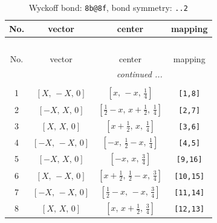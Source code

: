 \documentclass[fleqn,8pt]{jsarticle}
\begin{document}
\renewcommand{\arraystretch}{1.2}
\begin{longtable}{cccc}
\caption{Wyckoff bond: {\tt 8b@8f}, bond symmetry: {\tt ..2}}
 \\
 \hline \hline
No. & vector & center & mapping \\ \hline \endfirsthead

\multicolumn{3}{l}{\tablename\ \thetable{}} \\
 \hline \hline
No. & vector & center & mapping \\ \hline \endhead

 \hline \hline
\multicolumn{3}{r}{\footnotesize\it continued ...} \\ \endfoot

 \hline \hline
\multicolumn{3}{r}{} \\ \endlastfoot

1 & $\left[ X,\, - X,\, 0 \right]$ & $\left[ x,\, - x,\, \frac{1}{4} \right]$ & {\tt [1,8]} \\ \hline
2 & $\left[ - X,\, X,\, 0 \right]$ & $\left[ \frac{1}{2} - x,\, x + \frac{1}{2},\, \frac{1}{4} \right]$ & {\tt [2,7]} \\ \hline
3 & $\left[ X,\, X,\, 0 \right]$ & $\left[ x + \frac{1}{2},\, x,\, \frac{1}{4} \right]$ & {\tt [3,6]} \\ \hline
4 & $\left[ - X,\, - X,\, 0 \right]$ & $\left[ - x,\, \frac{1}{2} - x,\, \frac{1}{4} \right]$ & {\tt [4,5]} \\ \hline
5 & $\left[ - X,\, X,\, 0 \right]$ & $\left[ - x,\, x,\, \frac{3}{4} \right]$ & {\tt [9,16]} \\ \hline
6 & $\left[ X,\, - X,\, 0 \right]$ & $\left[ x + \frac{1}{2},\, \frac{1}{2} - x,\, \frac{3}{4} \right]$ & {\tt [10,15]} \\ \hline
7 & $\left[ - X,\, - X,\, 0 \right]$ & $\left[ \frac{1}{2} - x,\, - x,\, \frac{3}{4} \right]$ & {\tt [11,14]} \\ \hline
8 & $\left[ X,\, X,\, 0 \right]$ & $\left[ x,\, x + \frac{1}{2},\, \frac{3}{4} \right]$ & {\tt [12,13]} \\
\end{longtable}
\renewcommand{\arraystretch}{1.2}
\end{document}
